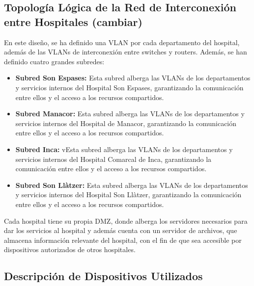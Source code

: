 \subsection{Topología Lógica de la Red de Interconexión entre Hospitales (cambiar)}
En este diseño, se ha definido una VLAN por cada departamento del hospital, además de las VLANs de interconexión entre switches y routers. Además, se han definido cuatro grandes subredes:
\begin{itemize}
    \item \textbf{Subred Son Espases:} Esta subred alberga las VLANs de los departamentos y servicios internos del Hospital Son Espases, garantizando la comunicación entre ellos y el acceso a los recursos compartidos.
    \item \textbf{Subred Manacor:} Esta subred alberga las VLANs de los departamentos y servicios internos del Hospital de Manacor, garantizando la comunicación entre ellos y el acceso a los recursos compartidos.
    \item \textbf{Subred Inca:} vEsta subred alberga las VLANs de los departamentos y servicios internos del Hospital Comarcal de Inca, garantizando la comunicación entre ellos y el acceso a los recursos compartidos.
    \item \textbf{Subred Son Llàtzer:} Esta subred alberga las VLANs de los departamentos y servicios internos del Hospital Son Llàtzer, garantizando la comunicación entre ellos y el acceso a los recursos compartidos.
\end{itemize}
Cada hospital tiene su propia DMZ, donde alberga los servidores necesarios para dar los servicios al hospital y además cuenta con un servidor de archivos, que almacena información relevante del hospital, con el fin de que sea accesible por dispositivos autorizados de otros hospitales.

\subsection{Descripción de Dispositivos Utilizados}

